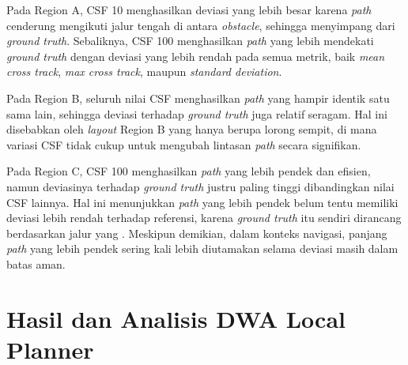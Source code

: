 Pada Region A, CSF 10 menghasilkan deviasi yang lebih besar karena
\emph{path} cenderung mengikuti jalur tengah di antara \emph{obstacle},
sehingga menyimpang dari \emph{ground truth}. Sebaliknya, CSF 100
menghasilkan \emph{path} yang lebih mendekati \emph{ground truth} dengan
deviasi yang lebih rendah pada semua metrik, baik \emph{mean cross track},
\emph{max cross track}, maupun \emph{standard deviation}.

Pada Region B, seluruh nilai CSF menghasilkan \emph{path} yang hampir
identik satu sama lain, sehingga deviasi terhadap \emph{ground truth}
juga relatif seragam. Hal ini disebabkan oleh \emph{layout} Region B yang
hanya berupa lorong sempit, di mana variasi CSF tidak cukup untuk mengubah
lintasan \emph{path} secara signifikan.

Pada Region C, CSF 100 menghasilkan \emph{path} yang lebih pendek dan
efisien, namun deviasinya terhadap \emph{ground truth} justru paling
tinggi dibandingkan nilai CSF lainnya. Hal ini menunjukkan \emph{path} yang lebih pendek belum tentu memiliki
deviasi lebih rendah terhadap referensi, karena \emph{ground truth} itu
sendiri dirancang berdasarkan jalur yang . Meskipun
demikian, dalam konteks navigasi, panjang \emph{path} yang lebih pendek
sering kali lebih diutamakan selama deviasi masih dalam batas aman.

\section{Hasil dan Analisis DWA Local Planner}

